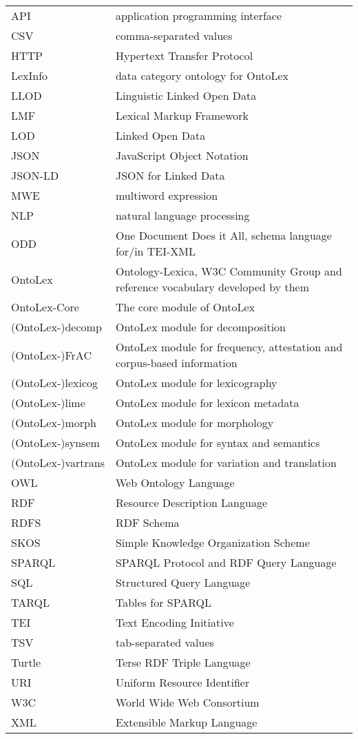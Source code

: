 \documentclass[output=paper,colorlinks,citecolor=brown]{langscibook}
\begin{document}
\begin{tabularx}{\textwidth}{@{}lQ@{}}
API & application programming interface\\
CSV & comma-separated values\\
HTTP & Hypertext Transfer Protocol\\
LexInfo & data category ontology for OntoLex\\
LLOD & Linguistic Linked Open Data\\
LMF & Lexical Markup Framework\\
LOD & Linked Open Data\\
JSON & JavaScript Object Notation\\
JSON-LD & JSON for Linked Data\\
MWE & multiword expression\\
NLP & natural language processing\\
ODD & One Document Does it All, schema language for/in TEI-XML\\
OntoLex & Ontology-Lexica, W3C Community Group and reference vocabulary developed by them\\
OntoLex-Core & The core module of OntoLex\\
(OntoLex-)decomp & OntoLex module for decomposition\\
(OntoLex-)FrAC & OntoLex module for frequency, attestation and corpus-based information\\
(OntoLex-)lexicog & OntoLex module for lexicography\\
(OntoLex-)lime & OntoLex module for lexicon metadata\\
(OntoLex-)morph & OntoLex module for morphology\\
(OntoLex-)synsem & OntoLex module for syntax and semantics\\
(OntoLex-)vartrans & OntoLex module for variation and translation\\
OWL & Web Ontology Language\\
RDF & Resource Description Language\\
RDFS & RDF Schema\\
SKOS & Simple Knowledge Organization Scheme\\
SPARQL & SPARQL Protocol and RDF Query Language\\
SQL & Structured Query Language \\ %
TARQL & Tables for SPARQL\\
TEI & Text Encoding Initiative\\
TSV & tab-separated values\\
Turtle & Terse RDF Triple Language\\
URI & Uniform Resource Identifier\\
W3C & World Wide Web Consortium\\
XML & Extensible Markup Language\\
\end{tabularx}
\end{document}
